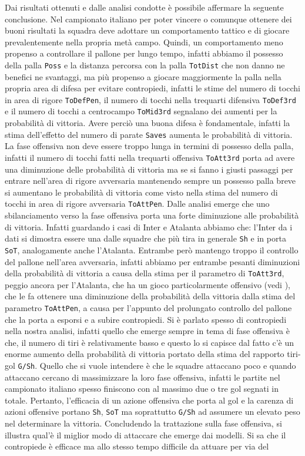 Dai risultati ottenuti e dalle analisi condotte è possibile affermare la seguente conclusione. Nel campionato italiano per poter vincere o comunque ottenere dei buoni risultati la squadra deve adottare un comportamento tattico e di giocare prevalentemente nella propria metà campo. Quindi, un comportamento meno propenso a controllare il pallone per lungo tempo, infatti abbiamo il possesso della palla \texttt{Poss} e la distanza percorsa con la palla \texttt{TotDist} che non danno ne benefici ne svantaggi, ma più propenso a giocare maggiormente la palla nella propria area di difesa per evitare contropiedi, infatti le stime del numero di tocchi in area di rigore \texttt{ToDefPen}, il numero di tocchi nella trequarti difensiva \texttt{ToDef3rd} e il numero di tocchi a centrocampo \texttt{ToMid3rd} segnalano dei aumenti per la probabilità di vittoria. Avere perciò una buona difesa è fondamentale, infatti la stima dell'effetto del numero di parate \texttt{Saves} aumenta le probabilità di vittoria. La fase offensiva non deve essere troppo lunga in termini di possesso della palla, infatti il numero di tocchi fatti nella trequarti offensiva \texttt{ToAtt3rd} porta ad avere una diminuzione delle probabilità di vittoria ma se si fanno i giusti passaggi per entrare nell'area di rigore avversaria mantenendo sempre un possesso palla breve si aumentano le probabilità di vittoria come visto nella stima del numero di tocchi in area di rigore avversaria \texttt{ToAttPen}. Dalle analisi emerge che uno sbilanciamento verso la fase offensiva porta una forte diminuzione alle probabilità di vittoria. Infatti guardando i casi di Inter e Atalanta abbiamo che: l'Inter da i dati si dimostra essere una dalle squadre che più tira in generale \texttt{Sh} e in porta \texttt{SoT}, analogamente anche l'Atalanta. Entrambe però mantengo troppo il controllo del pallone nell'area avversaria, infatti abbiamo per entrambe pesanti diminuzioni della probabilità di vittoria a causa della stima per il parametro di \texttt{ToAtt3rd}, peggio ancora per l'Atalanta, che ha un gioco particolarmente offensivo (vedi \textit{\cite{site:ataGioco}}), che le fa ottenere una diminuzione della probabilità della vittoria dalla stima del parametro \texttt{ToAttPen}, a causa per l'appunto del prolungato controllo del pallone che la porta a esporsi e a subire contropiedi. Si è parlato spesso di contropiedi nella nostra analisi, infatti quello che emerge sempre in tema di fase offensiva è che, il numero di tiri è relativamente basso e questo lo si capisce dal fatto c'è un enorme aumento della probabilità di vittoria portato della stima del rapporto tiri-gol \texttt{G/Sh}. Quello che si vuole intendere è che le squadre attaccano poco e quando attaccano cercano di massimizzare la loro fase offensiva, infatti le partite nel campionato italiano spesso finiscono con al massimo due o tre gol segnati in totale. Pertanto, l'efficacia di un azione offensiva che porta al gol e la carenza di azioni offensive portano \texttt{Sh}, \texttt{SoT} ma soprattutto \texttt{G/Sh} ad assumere un elevato peso nel determinare la vittoria. Concludendo la trattazione sulla fase offensiva, si illustra qual'è il miglior modo di attaccare che emerge dai modelli. Si sa che il contropiede è efficace ma allo stesso tempo difficile da attuare per via del 